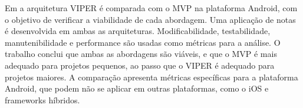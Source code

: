 Em \cite{humeniuk} a arquitetura VIPER é comparada com o MVP na plataforma Android, com o objetivo de verificar a viabilidade de cada abordagem.
Uma aplicação de notas é desenvolvida em ambas as arquiteturas.
Modificabilidade, testabilidade, manutenibilidade e performance são usadas como métricas para a análise.
O trabalho conclui que ambas as abordagens são viáveis, e que o MVP é mais adequado para projetos pequenos, ao passo que o VIPER é adequado para projetos maiores.
A comparação apresenta métricas específicas para a plataforma Android, que podem não se aplicar em outras plataformas, como o iOS e frameworks híbridos.